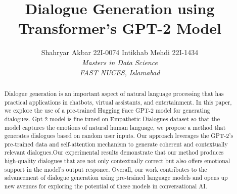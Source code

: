 \documentclass[12pt]{IEEEtran}
\begin{document}
\title{\textbf{Dialogue Generation using Transformer's GPT-2 Model }}
\author{{Shahryar Akbar 22I-0074 Intikhab Mehdi 22I-1434}

\emph{Masters in Data Science}

\emph{FAST NUCES, Islamabad}}
\maketitle
\begin{abstract}
Dialogue generation is an important aspect of natural language processing that has practical applications in chatbots, virtual assistants, and entertainment. In this paper, we explore the use of a pre-trained Hugging Face GPT-2 model for generating dialogues. Gpt-2 model is fine tuned on Empathetic Dialogues dataset so that the model captures the emotions of natural human language, we propose a method that generates dialogues based on random user inputs. Our approach leverages the GPT-2's pre-trained data and self-attention mechanism to generate coherent and contextually relevant dialogues.Our experimental results demonstrate that our method produces high-quality dialogues that are not only contextually correct but also offers emotional support in the model's output responce. Overall, our work contributes to the advancement of dialogue generation using pre-trained language models and opens up new avenues for exploring the potential of these models in conversational AI.
\end{abstract}
\end{document}
